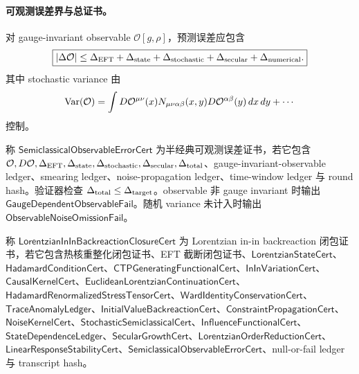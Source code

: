 \paragraph{可观测误差界与总证书。}
对 gauge-invariant observable \(\mathcal O[g,\rho]\)，预测误差应包含
\[
\boxed{
|\Delta\mathcal O|
\le
\Delta_{\rm EFT}
+\Delta_{\rm state}
+\Delta_{\rm stochastic}
+\Delta_{\rm secular}
+\Delta_{\rm numerical}.
}
\]
其中 stochastic variance 由
\[
{\rm Var}(\mathcal O)
=
\int
D\mathcal O^{\mu\nu}(x)
N_{\mu\nu\alpha\beta}(x,y)
D\mathcal O^{\alpha\beta}(y)\,dx\,dy
+\cdots
\]
控制。

\begin{definition}[半经典可观测误差证书]\label{def:typed-address-biaxial-completion-semiclassical-observable-error-cert}
称 \(\mathsf{SemiclassicalObservableErrorCert}\) 为半经典可观测误差证书，若它包含 \(\mathcal O,D\mathcal O,\Delta_{\rm EFT},\Delta_{\rm state},\Delta_{\rm stochastic},\Delta_{\rm secular},\Delta_{\rm total}\)、gauge-invariant-observable ledger、smearing ledger、noise-propagation ledger、time-window ledger 与 round hash。验证器检查 \(\Delta_{\rm total}\le\Delta_{\rm target}\)。observable 非 gauge invariant 时输出 \(\mathsf{GaugeDependentObservableFail}\)。随机 variance 未计入时输出 \(\mathsf{ObservableNoiseOmissionFail}\)。
\end{definition}

\begin{definition}\label{def:typed-address-biaxial-completion-lorentzian-in-in-backreaction-closure-cert}
称 \(\mathsf{LorentzianInInBackreactionClosureCert}\) 为 Lorentzian in-in backreaction 闭包证书，若它包含热核重整化闭包证书、EFT 截断闭包证书、\(\mathsf{LorentzianStateCert}\)、\(\mathsf{HadamardConditionCert}\)、\(\mathsf{CTPGeneratingFunctionalCert}\)、\(\mathsf{InInVariationCert}\)、\(\mathsf{CausalKernelCert}\)、\(\mathsf{EuclideanLorentzianContinuationCert}\)、\(\mathsf{HadamardRenormalizedStressTensorCert}\)、\(\mathsf{WardIdentityConservationCert}\)、\(\mathsf{TraceAnomalyLedger}\)、\(\mathsf{InitialValueBackreactionCert}\)、\(\mathsf{ConstraintPropagationCert}\)、\(\mathsf{NoiseKernelCert}\)、\(\mathsf{StochasticSemiclassicalCert}\)、\(\mathsf{InfluenceFunctionalCert}\)、\(\mathsf{StateDependenceLedger}\)、\(\mathsf{SecularGrowthCert}\)、\(\mathsf{LorentzianOrderReductionCert}\)、\(\mathsf{LinearResponseStabilityCert}\)、\(\mathsf{SemiclassicalObservableErrorCert}\)、null-or-fail ledger 与 transcript hash。
\end{definition}

